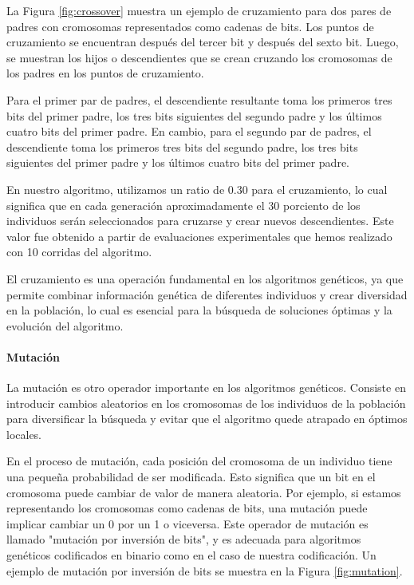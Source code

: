 La Figura \ref{fig:crossover} muestra un ejemplo de cruzamiento para dos pares de padres con cromosomas representados como cadenas de bits. Los puntos de cruzamiento se encuentran después del tercer bit y después del sexto bit. Luego, se muestran los hijos o descendientes que se crean cruzando los cromosomas de los padres en los puntos de cruzamiento.

Para el primer par de padres, el descendiente resultante toma los primeros tres bits del primer padre, los tres bits siguientes del segundo padre y los últimos cuatro bits del primer padre. En cambio, para el segundo par de padres, el descendiente toma los primeros tres bits del segundo padre, los tres bits siguientes del primer padre y los últimos cuatro bits del primer padre.

En nuestro algoritmo, utilizamos un ratio de 0.30 para el cruzamiento, lo cual significa que en cada generación aproximadamente el 30 porciento de los individuos serán seleccionados para cruzarse y crear nuevos descendientes. Este valor fue obtenido a partir de evaluaciones experimentales que hemos realizado con 10 corridas del algoritmo.

El cruzamiento es una operación fundamental en los algoritmos genéticos, ya que permite combinar información genética de diferentes individuos y crear diversidad en la población, lo cual es esencial para la búsqueda de soluciones óptimas y la evolución del algoritmo.


\paragraph{Mutación}

La mutación es otro operador importante en los algoritmos genéticos. Consiste en introducir cambios aleatorios en los cromosomas de los individuos de la población para diversificar la búsqueda y evitar que el algoritmo quede atrapado en óptimos locales.

En el proceso de mutación, cada posición del cromosoma de un individuo tiene una pequeña probabilidad de ser modificada. Esto significa que un bit en el cromosoma puede cambiar de valor de manera aleatoria. Por ejemplo, si estamos representando los cromosomas como cadenas de bits, una mutación puede implicar cambiar un 0 por un 1 o viceversa. Este operador de mutación es llamado "mutación por inversión de bits", y es adecuada para algoritmos genéticos codificados en binario como en el caso de nuestra codificación. Un ejemplo de mutación por inversión de bits se muestra en la Figura \ref{fig:mutation}.

